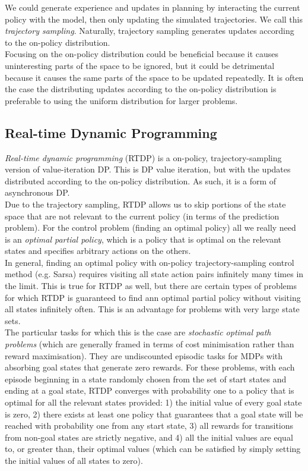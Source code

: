 We could generate experience and updates in planning by interacting the current policy with the model, then only updating the simulated trajectories. We call this \emph{trajectory sampling}. Naturally, trajectory sampling generates updates according to the on-policy distribution.\\

Focusing on the on-policy distribution could be beneficial because it causes uninteresting parts of the space to be ignored, but it could be detrimental because it causes the same parts of the space to be updated repeatedly. It is often the case the distributing updates according to the on-policy distribution is preferable to using the uniform distribution for larger problems.


\subsection{Real-time Dynamic Programming}
\emph{Real-time dynamic programming} (RTDP) is a on-policy, trajectory-sampling version of value-iteration DP. This is DP value iteration, but with the updates distributed according to the on-policy distribution. As such, it is a form of asynchronous DP. \\

Due to the trajectory sampling, RTDP allows us to skip portions of the state space that are not relevant to the current policy (in terms of the prediction problem). For the control problem (finding an optimal policy) all we really need is an \emph{optimal partial policy}, which is a policy that is optimal on the relevant states and specifies arbitrary actions on the others. \\

In general, finding an optimal policy with on-policy trajectory-sampling control method (e.g. Sarsa) requires visiting all state action pairs infinitely many times in the limit. This is true for RTDP as well, but there are certain types of problems for which RTDP is guaranteed to find ann optimal partial policy without visiting all states infinitely often. This is an advantage for problems with very large state sets. \\

The particular tasks for which this is the case are \emph{stochastic optimal path problems} (which are generally framed in terms of cost minimisation rather than reward maximisation). They are undiscounted episodic tasks for MDPs with absorbing goal states that generate zero rewards. For these problems, with each episode beginning in a state randomly chosen from the set of start states and ending at a goal state, RTDP converges with probability one to a policy that is optimal for all the relevant states provided: 1) the initial value of every goal state is zero, 2) there exists at least one policy that guarantees that a goal state will be reached with probability one from any start state, 3) all rewards for transitions from non-goal states are strictly negative, and 4) all the initial values are equal to, or greater than, their optimal values (which can be satisfied by simply setting the initial values of all states to zero).


